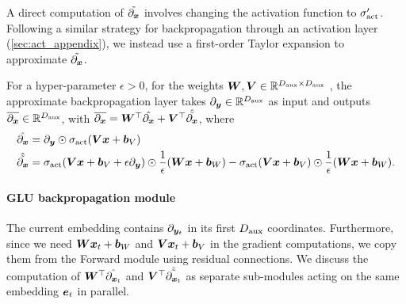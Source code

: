 A direct computation of $\Tilde{\partial_{{\bm{x}}}}$ involves changing the activation function to $\sigma_{\textrm{act}}'$.
Following a similar strategy for backpropagation through an activation layer (\cref{sec:act_appendix}), we instead use a first-order Taylor expansion to approximate $\Tilde{\partial_{{\bm{x}}}}$.


\begin{definition}\label{def:glu_backprop_appr}
    For a hyper-parameter $\epsilon > 0$, for the weights ${\bm{W}}, {\bm{V}} \in\mathbb{R}^{ D_{\text{aux}}  \times D_{\text{aux}} }$ , the approximate backpropagation layer takes $\partial_{ {\bm{y}} } \in\mathbb{R}^{ D_{\text{aux}} }$ as input and outputs $\overline{\partial_{{\bm{x}}}} \in\mathbb{R}^{ D_{\text{aux}} }$,  with $\overline{\partial_{{\bm{x}}}} = {\bm{W}}^{\top} \Hat{\partial_{{\bm{x}}}} + {\bm{V}}^{\top} \Hat{\Tilde{\partial_{{\bm{x}}}}}$, where
    \begin{align*}
        \Hat{\partial_{{\bm{x}}}} &=  \partial_{{\bm{y}}} \odot \sigma_{\textrm{act}}( {\bm{V}} {\bm{x}} + {\bm{b}}_V )  \\ 
        \Hat{\Tilde{\partial_{{\bm{x}}}}} &=   \sigma_{\textrm{act}}( {\bm{V}} {\bm{x}} + {\bm{b}}_V + \epsilon  \partial_{{\bm{y}}}  ) \odot \frac{1}{\epsilon} ({\bm{W}} {\bm{x}} + {\bm{b}}_W)  - \sigma_{\textrm{act}}( {\bm{V}} {\bm{x}} + {\bm{b}}_V  ) \odot \frac{1}{\epsilon} ({\bm{W}} {\bm{x}} + {\bm{b}}_W) .
    \end{align*}
\end{definition}



\paragraph{\simulator{} GLU backpropagation module} 
The current embedding contains $\partial_{{\bm{y}}_t}$ in its first $D_{\text{aux}}$ coordinates. Furthermore, since we need ${\bm{W}} {\bm{x}}_t + {\bm{b}}_W$ and ${\bm{V}} {\bm{x}}_t + {\bm{b}}_V$ in the gradient computations, we copy them from the Forward module using residual connections. We discuss the computation of ${\bm{W}}^{\top} \Hat{\partial_{{\bm{x}}_t}}$ and ${\bm{V}}^{\top} \Hat{\Tilde{\partial_{{\bm{x}}_t} }}$ as separate sub-modules acting on the same embedding $\ve_t$ in parallel.


